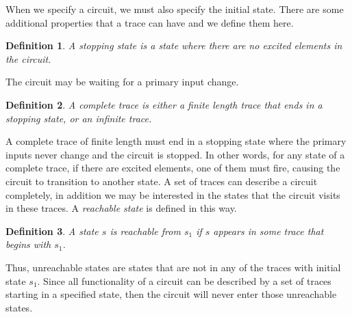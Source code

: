 \documentclass[12pt]{report}
\newtheorem*{definition}{Definition}
\begin{document}
When we specify a circuit, we must also specify the initial state.  
There are some additional properties that a trace can have and we define them here.
\begin{definition}
A {\em stopping state} is a state where there are no excited elements in the circuit. 
\end{definition} 
 The circuit may be waiting for a primary input change.
\begin{definition}
A {\em complete trace} is either a finite length trace that ends in a stopping state, or an infinite trace.
\end{definition}
A complete trace of finite length must end in a stopping state where the primary inputs never change and the circuit is stopped.  In other words, for any state of a complete trace, if there are excited elements, one of them must fire, causing the circuit to transition to another state.
A set of traces can describe a circuit completely, in addition we may be interested in the states that the circuit visits in these traces. 
A {\em reachable state} is defined in this way.
\begin{definition}
A state $s$ is {\em reachable} from $s_1$ if $s$ appears in some trace that begins with $s_1$.
\end{definition}
Thus, unreachable states are states that are not in any of the traces with initial state $s_1$.  Since all functionality of a circuit can be described by a set of traces starting in a specified state, then the circuit will never enter those unreachable states. 
\end{document}
